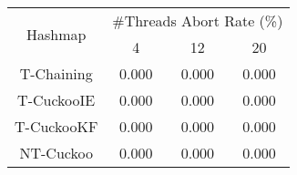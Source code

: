 \begin{tabular}{|c|c|c|c|}
\hline
\multirow{2}{*}{Hashmap} & \multicolumn{3}{c|}{\#Threads Abort Rate (\%)}\\\cline{2-4}& 4 & 12 & 20\\
\hline
\hline
T-Chaining & 0.000 & 0.000 & 0.000\\
T-CuckooIE & 0.000 & 0.000 & 0.000\\
T-CuckooKF & 0.000 & 0.000 & 0.000\\
NT-Cuckoo & 0.000 & 0.000 & 0.000\\
\hline
\end{tabular}
